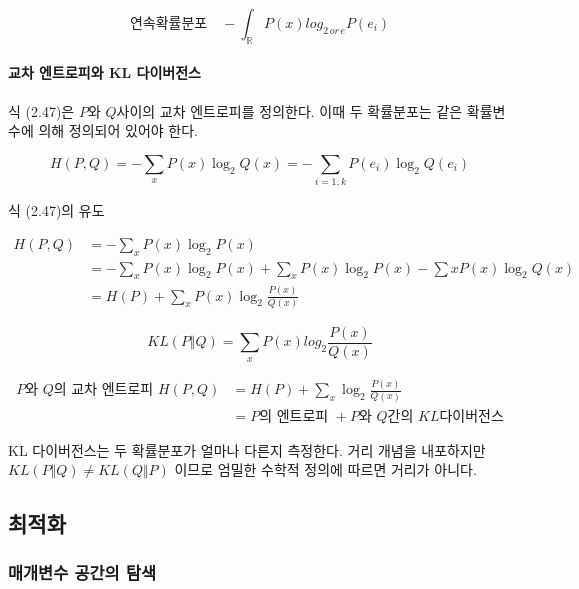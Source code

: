 \documentclass [12pt] {oblivoir}
\let\oldsubsubsection=\subsubsection
\renewcommand{\subsubsection}
{
  \filbreak
  \oldsubsubsection
}
\begin{document}
\begin{equation} \tag{2.46}
  \text{연속확률분포} \quad -\int_{\mathds{R}}P(x)log_{2\,or\,e}P(e_{i})
\end{equation}

\paragraph*{교차 엔트로피와 KL 다이버전스}\mbox{}

식 (2.47)은 $P$와 $Q$사이의 교차 엔트로피를 정의한다. 이때 두 확률분포는 같은 확률변수에 의해 정의되어 있어야 한다.

\begin{equation} \tag{2.47}
  H(P, Q) = -\sum_{x}P(x)\log_{2}Q(x) = -\sum_{i=1,k}P(e_{i})\log_{2}Q(e_{i})
\end{equation}

식 (2.47)의 유도

\begin{align*}
  H(P, Q) &= -\sum_{x}P(x)\log_{2}P(x) \\
          &= -\sum_{x}P(x)\log_{2}P(x) + \sum_{x}P(x)\log_{2}P(x) - \sum{x}P(x)\log_{2}Q(x) \\
          &= H(P) + \sum_{x}P(x)\log_{2}\frac{P(x)}{Q(x)}
\end{align*}

\begin{equation} \tag{2.48}
  KL(P \Vert Q) = \sum_{x}P(x)log_{2}\frac{P(x)}{Q(x)}
\end{equation}

\begin{align} \tag{2.49}
  P\text{와 } Q\text{의 교차 엔트로피 } H(P, Q)
  &= H(P) + \sum_{x}\log_{2}\frac{P(x)}{Q(x)} \\
  &= P\text{의 엔트로피 } + P\text{와 } Q\text{간의 } KL\text{다이버전스}
\end{align}

KL 다이버전스는 두 확률분포가 얼마나 다른지 측정한다. 거리 개념을 내포하지만 $KL(P \Vert Q) \neq KL(Q \Vert P)$ 이므로 엄밀한 수학적 정의에 따르면 거리가 아니다.

\vspace{3mm}

\subsection{최적화}

\subsubsection{매개변수 공간의 탐색}
\end{document}
